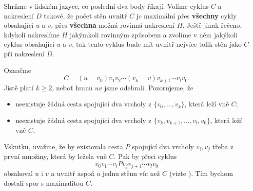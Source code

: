 \begin{enhproof}
 Shrňme v lidském jazyce, co poslední dva body říkají. Volíme cyklus $C$ a
 nakreslení $D$ takové, že počet stěn uvnitř $C$ je maximální přes
 \textbf{všechny} cykly obsahující $u$ a $v$, přes \textbf{všechna} možná
 rovinná nakreslení $H$. Ještě jinak řečeno, kdykoli nakreslíme $H$ jakýmkoli
 rovinným způsobem a zvolíme v něm jakýkoli cyklus obsahující $u$ a $v$, tak
 tento cyklus bude mít uvnitř nejvíce tolik stěn jako $C$ při nakreslení $D$.

 Označme
 \[
  C = (u = v_0)v_1v_2 \cdots (v_k = v)v_{k+1}\cdots v_lv_0.
 \]
 Jistě platí $k \geq 2$, neboť hranu $uv$ jsme odebrali. Pozorujeme, že
 \begin{itemize}
  \item neexistuje žádná cesta spojující dva vrcholy z $\{v_0,\ldots,v_k\}$,
   která leží vně $C$;
  \item neexistuje žádná cesta spojující dva vrcholy z
   $\{v_k,v_{k+1},\ldots,v_l,v_0\}$, která leží vně $C$.
 \end{itemize}
 Vskutku, uvažme, že by existovala cesta $P$ spojující dva vrcholy $v_i,v_j$
 třeba z první množiny, která by ležela vně $C$. Pak by přeci cyklus
 \[
  v_0v_1\cdots v_iPv_jv_{j+1}\cdots v_lv_0
 \] 
 obsahoval $u$ i $v$ a uvnitř aspoň o jednu stěnu víc než $C$ (vizte
 ). Tím bychom dostali spor s maximalitou
 $C$.

 \begin{figure}[H]
  \centering


\end{figure}
\end{enhproof}
